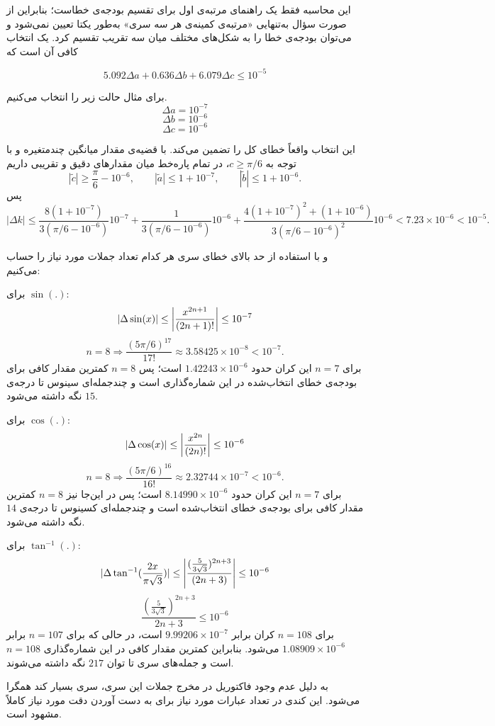 این محاسبه فقط یک راهنمای مرتبه‌ی اول برای تقسیم بودجه‌ی خطاست؛ بنابراین از صورت سؤال به‌تنهایی «مرتبه‌ی کمینه‌ی هر سه سری» به‌طور یکتا تعیین نمی‌شود و می‌توان بودجه‌ی خطا را به شکل‌های مختلف میان سه تقریب تقسیم کرد. یک انتخاب کافی آن است که

$$5.092 \Delta a + 0.636 \Delta b + 6.079 \Delta c  \leq 10^{-5}$$

برای مثال حالت زیر را انتخاب می‌کنیم.
$$\Delta a  = 10^{-7}$$
$$\Delta b = 10^{-6}$$
$$\Delta c = 10^{-6}$$

این انتخاب واقعاً خطای کل را تضمین می‌کند. با قضیه‌ی مقدار میانگین چندمتغیره و با توجه به
\(c\geq\pi/6\)، در تمام پاره‌خط میان مقدارهای دقیق و تقریبی داریم
\[
 |\widetilde c|\geq \frac{\pi}{6}-10^{-6},
 \qquad |\widetilde a|\leq1+10^{-7},
 \qquad |\widetilde b|\leq1+10^{-6}.
\]
پس
\[
 |\Delta k|
 \leq
 \frac{8(1+10^{-7})}{3(\pi/6-10^{-6})}10^{-7}
 +\frac{1}{3(\pi/6-10^{-6})}10^{-6}
 +\frac{4(1+10^{-7})^2+(1+10^{-6})}
 {3(\pi/6-10^{-6})^2}10^{-6}
 <7.23\times10^{-6}<10^{-5}.
\]

و با استفاده از حد بالای خطای سری هر کدام تعداد جملات مورد نیاز را حساب می‌کنیم:

برای $\sin(.)$:
$$|\Delta \sin(x)| \leq \abs{\frac{x^{2n+1}}{(2n+1)!}} \leq 10^{-7}$$
$$n=8 \Rightarrow \frac{(5\pi/6)^{17}}{17!}\approx 3.58425\times10^{-8}<10^{-7}.$$
برای \(n=7\) این کران حدود
\(1.42243\times10^{-6}\)
است؛ پس \(n=8\) کمترین مقدار کافی برای بودجه‌ی خطای انتخاب‌شده در این شماره‌گذاری است و چندجمله‌ای سینوس تا درجه‌ی \(15\) نگه داشته می‌شود.

برای $\cos(.)$: 
$$|\Delta \cos(x)| \leq \abs{\frac{x^{2n}}{(2n)!}} \leq 10^{-6}$$
$$n=8 \Rightarrow \frac{(5\pi/6)^{16}}{16!}\approx 2.32744\times10^{-7}<10^{-6}.$$
برای \(n=7\) این کران حدود
\(8.14990\times10^{-6}\)
است؛ پس در این‌جا نیز \(n=8\) کمترین مقدار کافی برای بودجه‌ی خطای انتخاب‌شده است و چندجمله‌ای کسینوس تا درجه‌ی \(14\) نگه داشته می‌شود.

برای $\tan^{-1}(.)$:
$$|\Delta \tan^{-1}(\frac{2x}{\pi \sqrt{3}})| \leq \abs{\frac{(\frac{5}{3\sqrt{3}})^{2n+3}}{(2n+3)}} \leq 10^{-6}$$
$$\frac{\left(\frac{5}{3\sqrt3}\right)^{2n+3}}{2n+3} \leq 10^{-6}$$
برای \(n=108\) کران برابر
\(9.99206\times10^{-7}\)
است، در حالی که برای \(n=107\) برابر
\(1.08909\times10^{-6}\)
می‌شود. بنابراین کمترین مقدار کافی در این شماره‌گذاری
\(n=108\)
است و جمله‌های سری تا توان \(217\) نگه داشته می‌شوند.

به دلیل عدم وجود فاکتوریل در مخرج جملات این سری، سری بسیار کند همگرا می‌شود. این کندی در تعداد عبارات مورد نیاز برای به دست آوردن دقت مورد نیاز کاملاً مشهود است.

